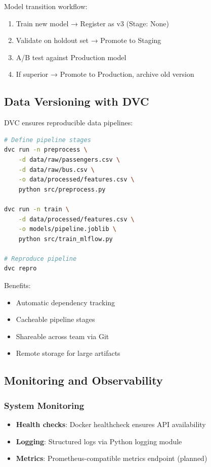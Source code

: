Model transition workflow:
\begin{enumerate}
    \item Train new model → Register as v3 (Stage: None)
    \item Validate on holdout set → Promote to Staging
    \item A/B test against Production model
    \item If superior → Promote to Production, archive old version
\end{enumerate}

\subsection{Data Versioning with DVC}

DVC ensures reproducible data pipelines:

\begin{lstlisting}[language=bash, caption=DVC Pipeline]
# Define pipeline stages
dvc run -n preprocess \
    -d data/raw/passengers.csv \
    -d data/raw/bus.csv \
    -o data/processed/features.csv \
    python src/preprocess.py

dvc run -n train \
    -d data/processed/features.csv \
    -o models/pipeline.joblib \
    python src/train_mlflow.py

# Reproduce pipeline
dvc repro
\end{lstlisting}

Benefits:
\begin{itemize}
    \item Automatic dependency tracking
    \item Cacheable pipeline stages
    \item Shareable across team via Git
    \item Remote storage for large artifacts
\end{itemize}

\subsection{Monitoring and Observability}

\subsubsection{System Monitoring}

\begin{itemize}
    \item \textbf{Health checks}: Docker healthcheck ensures API availability
    \item \textbf{Logging}: Structured logs via Python logging module
    \item \textbf{Metrics}: Prometheus-compatible metrics endpoint (planned)
\end{itemize}

